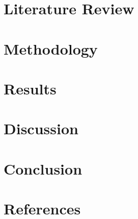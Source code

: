 \documentclass[12pt,oneside]{report}
\begin{document}
\chapter{Literature Review}

\chapter{Methodology}

\chapter{Results}

\chapter{Discussion}

\chapter{Conclusion}

\chapter{References}


\end{document}
